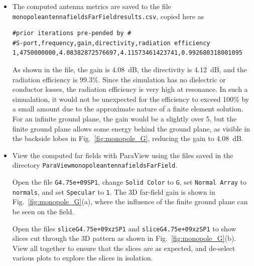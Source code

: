 \documentclass[titlepage]{article}
\renewcommand\_{\textunderscore\linebreak[1]}
\begin{document}
\begin{itemize}
\item The computed antenna metrics are saved to the file \texttt{monopole\_antenna\_fields\_FarField\_results.csv}, copied here as
\begin{Verbatim}[fontsize=\small]
#prior iterations pre-pended by #
#S-port,frequency,gain,directivity,radiation efficiency
1,4750000000,4.08382872576697,4.11573461423741,0.992680318001095
\end{Verbatim}
\noindent As shown in the file, the gain is 4.08~dB, the directivity is 4.12~dB, and the radiation efficiency is 99.3\%.  Since the simulation has no dielectric or conductor losses, the radiation efficiency is very high at resonance.  In such a simualation, it would not be unexpected for the efficiency to exceed 100\% by a small amount due to the approximate nature of a finite element solution.  For an infinite ground plane, the gain would be a slightly over 5, but the finite ground plane allows some energy behind the ground plane, as visible in the backside lobes in Fig.~\ref{fig:monopole_G}, reducing the gain to 4.08~dB.

\item View the computed far fields with ParaView using the files saved in the directory \texttt{ParaView\_monopole\_antenna\_fields\_FarField}.

Open the file \texttt{G\_4.75e+09\_SP1}, change \texttt{Solid Color} to \texttt{G}, set \texttt{Normal Array} to \texttt{normals}, and set \texttt{Specular} to \texttt{1}.  The 3D far-field gain is shown in Fig.~\ref{fig:monopole_G}(a), where the influence of the finite ground plane can be seen on the field.

Open the files \texttt{slice\_G\_4.75e+09\_xz\_0\_0\_SP1} and \texttt{slice\_G\_4.75e+09\_xz\_0\_0\_SP1} to show slices cut through the 3D pattern as shown in Fig.~\ref{fig:monopole_G}(b).  View all together to ensure that the slices are as expected, and de-select various plots to explore the slices in isolation.


\end{itemize}
\end{document}

